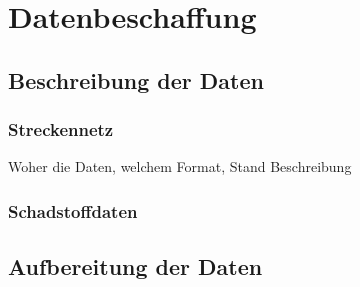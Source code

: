 \section{Datenbeschaffung}



\subsection{Beschreibung der Daten}
\subsubsection{Streckennetz}

Woher die Daten, welchem Format, Stand
Beschreibung
\subsubsection{Schadstoffdaten}

\subsection{Aufbereitung der Daten}
